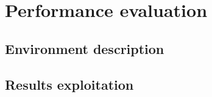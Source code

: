 \section{Performance evaluation}

\subsection{Environment description}

\subsection{Results exploitation}
